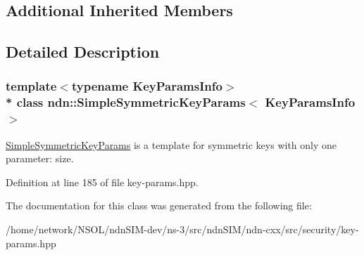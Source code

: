 \subsection*{Additional Inherited Members}


\subsection{Detailed Description}
\subsubsection*{template$<$typename Key\+Params\+Info$>$\\*
class ndn\+::\+Simple\+Symmetric\+Key\+Params$<$ Key\+Params\+Info $>$}

\hyperlink{classndn_1_1SimpleSymmetricKeyParams}{Simple\+Symmetric\+Key\+Params} is a template for symmetric keys with only one parameter\+: size. 

Definition at line 185 of file key-\/params.\+hpp.



The documentation for this class was generated from the following file\+:\begin{DoxyCompactItemize}
\item 
/home/network/\+N\+S\+O\+L/ndn\+S\+I\+M-\/dev/ns-\/3/src/ndn\+S\+I\+M/ndn-\/cxx/src/security/key-\/params.\+hpp\end{DoxyCompactItemize}
